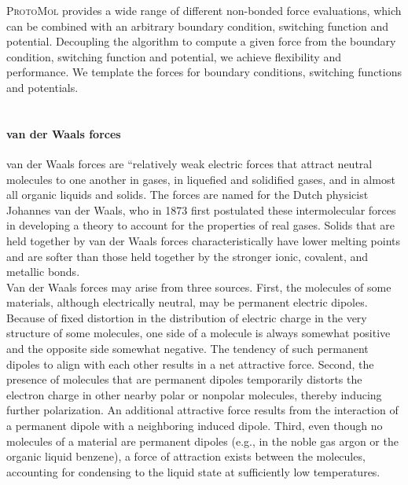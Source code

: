 \documentclass[11pt]{report}
\newcommand{\ProtoMol}{\textsc{ProtoMol }}
\begin{document}
\begin{appendix}
\ProtoMol provides a wide range of different non-bonded force
evaluations, which can be combined with an arbitrary boundary
condition, switching function and potential. Decoupling the algorithm
to compute a given force from the boundary condition, switching
function and potential, we achieve flexibility and performance.  We
template the forces for boundary conditions, switching functions and
potentials. \\ \\

\paragraph{van der Waals forces~\cite{EnBr00}}

 van der Waals forces are ``relatively weak electric forces that attract
neutral molecules to one another in gases, in
liquefied and solidified gases, and in almost
all organic liquids and solids. The forces are
named for the Dutch physicist Johannes van der
Waals, who in 1873 first postulated these
intermolecular forces in developing a theory to
account for the properties of real gases. Solids
that are held together by van der Waals forces
characteristically have lower melting points and
are softer than those held together by the
stronger ionic, covalent, and metallic bonds.\\

Van der Waals forces may arise from three sources. First, the
molecules of some materials, although electrically neutral,
may be permanent electric dipoles. Because of fixed
distortion in the distribution of electric charge in the very
structure of some molecules, one side of a molecule is always
somewhat positive and the opposite side somewhat negative.
The tendency of such permanent dipoles to align with each
other results in a net attractive force. Second, the presence
of molecules that are permanent dipoles temporarily distorts
the electron charge in other nearby polar or nonpolar
molecules, thereby inducing further polarization. An additional attractive force results from the
interaction of a permanent dipole with a neighboring induced
dipole. Third, even though no molecules of a material are
permanent dipoles (e.g., in the noble gas argon or the
organic liquid benzene), a force of attraction exists between
the molecules, accounting for condensing to the liquid state
at sufficiently low temperatures.\\


\end{appendix}
\end{document}
